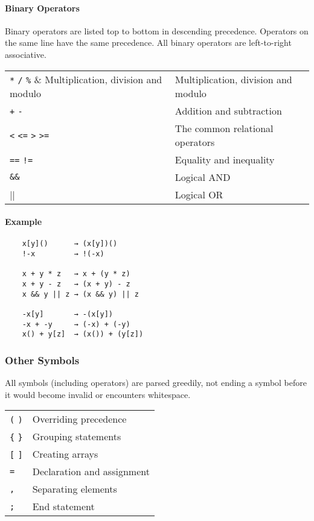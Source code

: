 \paragraph{Binary Operators}

Binary operators are listed top to bottom in descending precedence. Operators on the same line have the same precedence. All binary operators are left-to-right associative.

\begin{table}[H]
    \begin{tabular}{ l l }
        \verb|*| \verb|/| \verb|%|            & Multiplication, division and modulo \\
        \verb|+| \verb|-|                     & Addition and subtraction            \\
        \verb|<| \verb|<=| \verb|>| \verb|>=| & The common relational operators     \\
        \verb|==| \verb|!=|                   & Equality and inequality             \\
        \verb|&&|                             & Logical AND                         \\
        \verb||||                             & Logical OR
    \end{tabular}
\end{table}

\paragraph{Example}

\begin{verbatim}
    x[y]()      → (x[y])()
    !-x         → !(-x)

    x + y * z   → x + (y * z)
    x + y - z   → (x + y) - z
    x && y || z → (x && y) || z

    -x[y]       → -(x[y])
    -x + -y     → (-x) + (-y)
    x() + y[z]  → (x()) + (y[z])
\end{verbatim}

\subsubsection{Other Symbols}

All symbols (including operators) are parsed greedily, not ending a symbol before it would become invalid or encounters whitespace.

\begin{table}[H]
    \begin{tabular}{ l l }
        \verb|(| \verb|)| & Overriding precedence      \\
        \verb|{| \verb|}| & Grouping statements        \\
        \verb|[| \verb|]| & Creating arrays            \\
        \verb|=|          & Declaration and assignment \\
        \verb|,|          & Separating elements        \\
        \verb|;|          & End statement
    \end{tabular}
\end{table}

